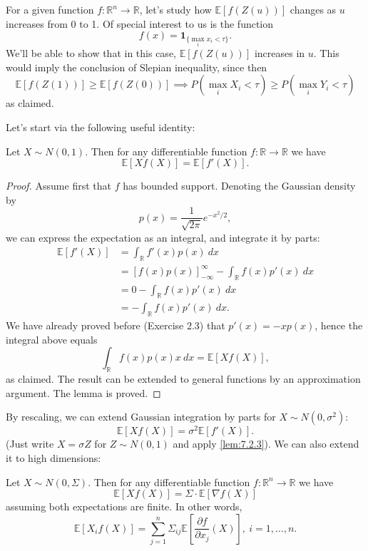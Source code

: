 For a given function $f: \mathbb{R}^n \to \mathbb{R}$, let's study how $\mathbb{E}\left[ f(Z(u)) \right]$ 
changes as $u$ increases from 0 to 1. Of special interest to us is the function 
\[ f(x) = \mathbf{1}_{\{\max_{i} x_i < \tau\}}. \]
We'll be able to show that in this case, $\mathbb{E}\left[ f(Z(u)) \right]$ increases in $u$. This would imply 
the conclusion of Slepian inequality, since then 
\[ \mathbb{E}\left[ f(Z(1)) \right] \geq \mathbb{E}\left[ f(Z(0)) \right] 
\implies P \left( \max_{i} X_i < \tau \right) \geq P \left( \max_{i} Y_i < \tau \right) \]
as claimed.

Let's start via the following useful identity:
\begin{lemma}
\label{lem:7.2.3}
Let $X \sim N(0, 1)$. Then for any differentiable function $f: \mathbb{R} \to \mathbb{R}$ we have 
\[ \mathbb{E}\left[ Xf(X) \right] = \mathbb{E}\left[ f'(X) \right]. \]
\end{lemma}

\begin{proof}
Assume first that $f$ has bounded support. Denoting the Gaussian density by 
\[ p(x) = \frac{1}{\sqrt{2 \pi}}e^{-x^2 / 2}, \]
we can express the expectation as an integral, and integrate it by parts:
\begin{align*}
	\mathbb{E}\left[ f'(X) \right] 
	&= \int_{\mathbb{R}}^{} f'(x)p(x) \ dx \\
	&= [f(x)p(x)]_{-\infty}^\infty - \int_{\mathbb{R}}^{} f(x)p'(x) \ dx \\
	&= 0 - \int_{\mathbb{R}}^{} f(x)p'(x) \ dx \\
	&= - \int_{\mathbb{R}}^{} f(x)p'(x) \ dx.
\end{align*}
We have already proved before (Exercise 2.3) that $p'(x) = -xp(x)$, hence the integral above equals 
\[ \int_{\mathbb{R}}^{} f(x)p(x)x \ dx = \mathbb{E}\left[ Xf(X) \right], \]
as claimed. The result can be extended to general functions by an approximation argument. The lemma is proved.
\end{proof}

By rescaling, we can extend Gaussian integration by parts for $X \sim N(0, \sigma^2)$: 
\[ \mathbb{E}\left[ Xf(X) \right] = \sigma^2 \mathbb{E}\left[ f'(X) \right]. \]
(Just write $X = \sigma Z$ for $Z \sim N(0, 1)$ and apply \cref{lem:7.2.3}). We can also extend it to high 
dimensions: 

\begin{lemma}
\label{lem:7.2.4}
Let $X \sim N(0, \Sigma)$. Then for any differentiable function $f: \mathbb{R}^n \to \mathbb{R}$ we have 
\[ \mathbb{E}\left[ Xf(X) \right] = \Sigma \cdot \mathbb{E}\left[ \nabla f(X) \right] \]
assuming both expectations are finite. In other words, 
\[ \mathbb{E}\left[ X_i f(X) \right] = \sum_{j = 1}^{n} \Sigma_{ij} 
\mathbb{E}\left[ \frac{\partial f}{\partial x_j}(X) \right], \ i = 1, \dots, n. \]
\end{lemma}

